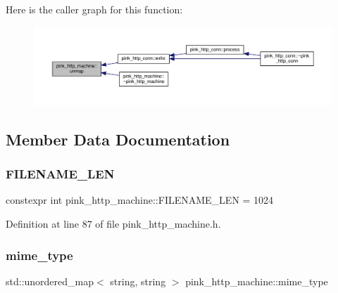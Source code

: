 Here is the caller graph for this function\+:\nopagebreak
\begin{figure}[H]
\begin{center}
\leavevmode
\includegraphics[width=350pt]{classpink__http__machine_a26debab8c361df5c79966f11e2b2dd17_icgraph}
\end{center}
\end{figure}


\subsection{Member Data Documentation}
\mbox{\label{classpink__http__machine_a33993ee83910b37ae5672c6e6c94cac3}} 
\subsubsection{\texorpdfstring{F\+I\+L\+E\+N\+A\+M\+E\+\_\+\+L\+EN}{FILENAME\_LEN}}
{\footnotesize\ttfamily constexpr int pink\+\_\+http\+\_\+machine\+::\+F\+I\+L\+E\+N\+A\+M\+E\+\_\+\+L\+EN = 1024\hspace{0.3cm}{\ttfamily [static]}}



Definition at line 87 of file pink\+\_\+http\+\_\+machine.\+h.

\mbox{\label{classpink__http__machine_a4373363c5bd675e182f502d300157aa9}} 
\subsubsection{\texorpdfstring{mime\+\_\+type}{mime\_type}}
{\footnotesize\ttfamily std\+::unordered\+\_\+map$<$ string, string $>$ pink\+\_\+http\+\_\+machine\+::mime\+\_\+type\hspace{0.3cm}{\ttfamily [static]}}

